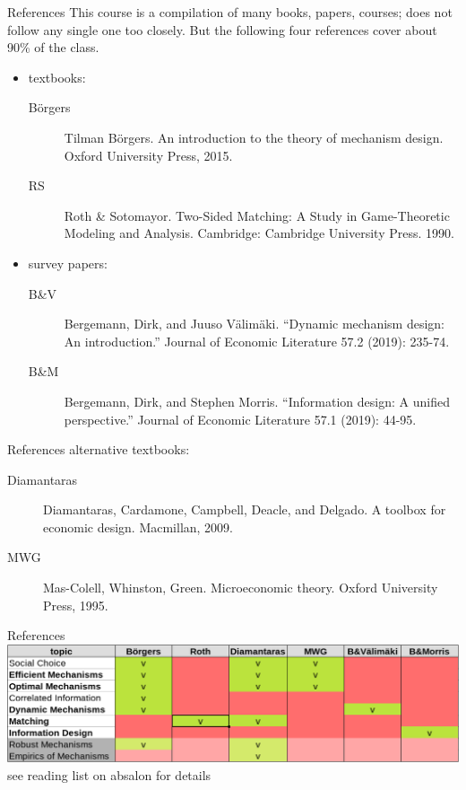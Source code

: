 \documentclass[english,10pt
,aspectratio=169
]{beamer}
\begin{document}
\begin{frame}{References}
	This course is a compilation of many books, papers, courses; does not follow any single one too closely. But the following four references cover about 90\% of the class.
	\begin{itemize}
		\item textbooks:
		\begin{description}
			\item[B\"{o}rgers] Tilman B\"{o}rgers. An introduction to the theory of mechanism design. Oxford University Press, 2015.
			\item[RS] Roth \& Sotomayor. Two-Sided Matching: A Study in Game-Theoretic Modeling and Analysis. Cambridge: Cambridge University Press. 1990.
		\end{description}
		\item survey papers:
		\begin{description}
			\item[B\&V] Bergemann, Dirk, and Juuso Välimäki. ``Dynamic mechanism design: An introduction.'' Journal of Economic Literature 57.2 (2019): 235-74.
			\item[B\&M] Bergemann, Dirk, and Stephen Morris. ``Information design: A unified perspective.'' Journal of Economic Literature 57.1 (2019): 44-95. 
		\end{description}
	\end{itemize}
\end{frame}


\begin{frame}{References}
	alternative textbooks:
	\begin{description}
		\item[Diamantaras] Diamantaras, Cardamone, Campbell, Deacle, and Delgado. A toolbox for economic design. Macmillan, 2009.
		\item[MWG] Mas-Colell,  Whinston, Green. Microeconomic theory. Oxford University Press, 1995. 
	\end{description}
\end{frame}


\begin{frame}{References}
	\includegraphics[width=\textwidth]{pics/M0/sources}
	\\
	see reading list on absalon for details
\end{frame}
\end{document}
